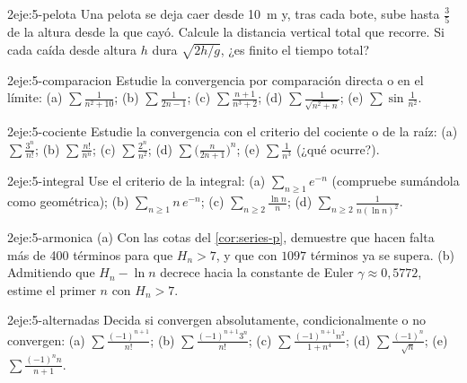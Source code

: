 \begin{ejercicio}{2}{eje:5-pelota}
Una pelota se deja caer desde 10~m y, tras cada bote, sube hasta $\frac35$ de la altura desde la que cayó. Calcule la distancia vertical total que recorre. Si cada caída desde altura $h$ dura $\sqrt{2h/g}$, ¿es finito el tiempo total?
\end{ejercicio}

\begin{ejercicio}{2}{eje:5-comparacion}
Estudie la convergencia por comparación directa o en el límite: (a) $\sum\frac{1}{n^{2}+10}$; (b) $\sum\frac{1}{2n-1}$; (c) $\sum\frac{n+1}{n^{3}+2}$; (d) $\sum\frac{1}{\sqrt{n^{2}+n}}$; (e) $\sum\sin\frac{1}{n^{2}}$.
\end{ejercicio}

\begin{ejercicio}{2}{eje:5-cociente}
Estudie la convergencia con el criterio del cociente o de la raíz: (a) $\sum\frac{3^{n}}{n!}$; (b) $\sum\frac{n!}{n^{n}}$; (c) $\sum\frac{2^{n}}{n^{2}}$; (d) $\sum\bigl(\frac{n}{2n+1}\bigr)^{n}$; (e) $\sum\frac{1}{n^{3}}$ (¿qué ocurre?).
\end{ejercicio}

\begin{ejercicio}{2}{eje:5-integral}
Use el criterio de la integral: (a) $\sum_{n\ge1}e^{-n}$ (compruebe sumándola como geométrica); (b) $\sum_{n\ge1}n\,e^{-n}$; (c) $\sum_{n\ge2}\frac{\ln n}{n}$; (d) $\sum_{n\ge2}\frac{1}{n(\ln n)^{2}}$.
\end{ejercicio}

\begin{ejercicio}{2}{eje:5-armonica}
(a) Con las cotas del \cref{cor:series-p}, demuestre que hacen falta más de 400 términos para que $H_n>7$, y que con $1097$ términos ya se supera. (b) Admitiendo que $H_n-\ln n$ decrece hacia la constante de Euler $\gamma\approx0{,}5772$, estime el primer $n$ con $H_n>7$.
\end{ejercicio}

\begin{ejercicio}{2}{eje:5-alternadas}
Decida si convergen absolutamente, condicionalmente o no convergen: (a) $\sum\frac{(-1)^{n+1}}{n!}$; (b) $\sum\frac{(-1)^{n+1}3^{n}}{n!}$; (c) $\sum\frac{(-1)^{n+1}n^{2}}{1+n^{4}}$; (d) $\sum\frac{(-1)^{n}}{\sqrt n}$; (e) $\sum\frac{(-1)^{n}n}{n+1}$.
\end{ejercicio}

